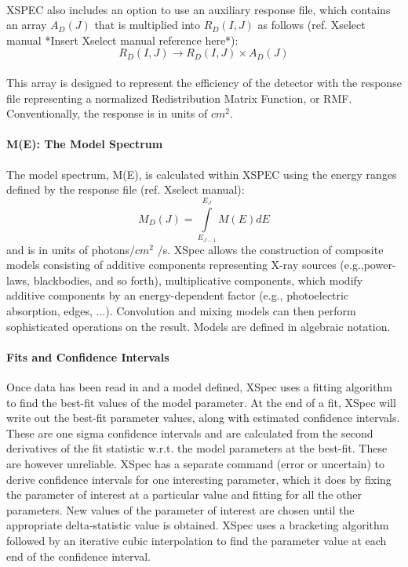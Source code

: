 \documentclass[a4paper,twoside]{report}
\numberwithin{equation}{section}
\begin{document}
\paragraph{}
XSPEC also includes an option to use an auxiliary response file, which contains an array $A_D (J)$ that is multiplied into $R_D (I, J)$ as follows (ref. Xselect manual *Insert Xselect manual reference here*):
\begin{equation}
{R_D (I,J) \rightarrow R_D (I,J) \times A_D (J)}
\end{equation}
\paragraph{}
This array is designed to represent the efficiency of the detector with the response file representing a normalized Redistribution Matrix Function, or RMF.
Conventionally, the response is in units of $cm^2$.
\paragraph{M(E): The Model Spectrum}
The model spectrum, M(E), is calculated within XSPEC using the energy ranges defined by the response file (ref. Xselect manual):
\begin{equation}
{M_D (J) = \int\limits_{E_{J-1}}^{E_J} M(E) dE}
\end{equation}
and is in units of photons/$cm^2$ /s. XSpec allows the construction of composite models consisting of additive components representing X-ray sources (e.g.,power-laws, blackbodies, and so forth), multiplicative components, which modify additive components by an energy-dependent factor (e.g., photoelectric absorption, edges, ...). Convolution and mixing models can then perform sophisticated operations on the result. Models are defined in algebraic notation.
\paragraph{Fits and Confidence Intervals}
Once data has been read in and a model defined, XSpec uses a fitting algorithm to find the best-fit values of the model parameter. At the end of a fit, XSpec will write out the best-fit parameter values, along with estimated confidence intervals. These are one sigma confidence intervals and are calculated from the second derivatives of the fit statistic w.r.t. the model parameters at the best-fit. These are however unreliable. XSpec has a separate command (error or uncertain) to derive confidence intervals for one interesting parameter, which it does by fixing the parameter of interest at a particular value and fitting for all the other parameters. New values of the parameter of interest are chosen until the appropriate delta-statistic value is obtained. XSpec uses a bracketing algorithm followed by an iterative cubic interpolation to find the parameter value at each end of the confidence interval.
\end{document}
